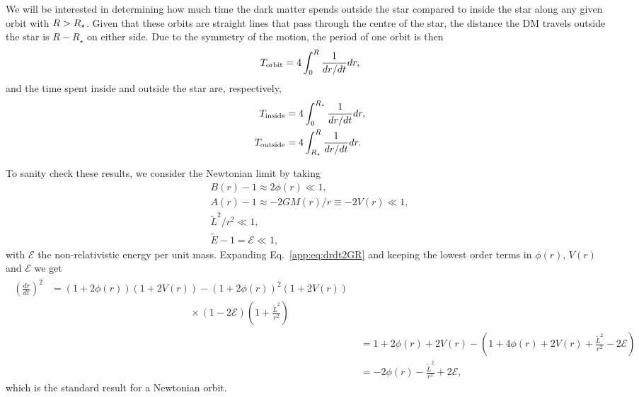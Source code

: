 We will be interested in determining how much time the dark matter spends outside the star compared to inside the star along any given orbit with $R>R_\star$.
Given that these orbits are straight lines that pass through the centre of the star, the distance the DM travels outside the star is $R - R_\star$ on either side. 
Due to the symmetry of the motion, the period of one orbit is then
\begin{equation}
    T_{\rm orbit} = 4 \int_0^R \frac{1}{dr/dt}dr,
\end{equation}
and the time spent inside and outside the star are, respectively,
\begin{align}
    T_{\rm inside} & = 4 \int_0^{R_\star} \frac{1}{dr/dt}dr, \label{app:eq:timeinside}\\
    T_{\rm outside} & = 4 \int_{R_\star}^R \frac{1}{dr/dt}dr. \label{app:eq:timeoutside}
\end{align}

To sanity check these results, we consider the Newtonian limit by taking
\begin{gather}
    B(r) - 1\approx 2 \phi(r) \ll 1,\\
    A(r) - 1 \approx - 2 G M(r) / r \equiv -2V(r)\ll 1,\\
    \tilde L^2 /r^2 \ll 1,\\
    \tilde E - 1 = \mathcal{E} \ll 1,
\end{gather}
with $\mathcal{E}$ the non-relativistic energy per unit mass. Expanding Eq.~\ref{app:eq:drdt2GR} and keeping the lowest order terms in $\phi(r)$, $V(r)$ and $\mathcal{E}$ we get
\begin{align}
    \begin{split}
    \left(\frac{dr}{dt}\right)^2 & = (1 + 2 \phi(r))(1 + 2V(r)) - (1 + 2\phi(r))^2(1 + 2 V(r))\\
    &\hspace{14em}\times(1 - 2 \mathcal{E})\left(1 + \frac{\tilde L^2}{r^2}\right)
    \end{split}\\
    & = 1 + 2 \phi(r) + 2 V(r) - \left(1 + 4 \phi(r) + 2 V(r)+ \frac{\tilde L^2}{r^2} - 2 \mathcal{E} \right)\\
    & = -2 \phi(r) - \frac{\tilde L^2}{r^2} + 2 \mathcal{E},
\end{align}
which is the standard result for a Newtonian orbit.
